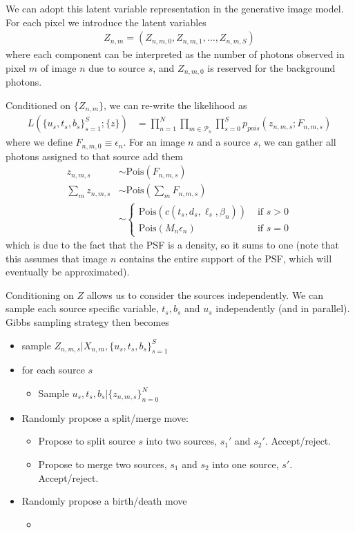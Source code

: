 \documentclass[11pt]{article}
\begin{document}
We can adopt this latent variable representation in the generative image model.  For each pixel we introduce the latent variables
\begin{align}
 Z_{n,m} = (Z_{n,m,0}, Z_{n,m,1}, \dots, Z_{n,m,S})
\end{align}
where each component can be interpreted as the number of photons observed in pixel $m$ of image $n$ due to source $s$, and $Z_{n,m,0}$ is reserved for the background photons.  

Conditioned on $\{Z_{n,m}\}$, we can re-write the likelihood as 
\begin{align}
  L(\{u_s, t_s, b_s\}_{s=1}^S; \{z\})
     &= \prod_{n=1}^N \prod_{m \in \mathcal{P}_n} \prod_{s=0}^S  p_{pois}(z_{n,m,s} ; F_{n,m, s}) 
\end{align}
where we define $F_{n,m,0} \equiv \epsilon_n$.  For an image $n$ and a source $s$, we can gather all photons assigned to that source add them
\begin{align}
  z_{n,m,s} &\sim \textrm{Pois}(F_{n,m,s}) \\
  \sum_{m} z_{n,m,s} &\sim \textrm{Pois}\left( \sum_{m} F_{n,m,s} \right) \\
    &\sim \begin{cases}
         \textrm{Pois}( c(t_s, d_s, \ell_s, \beta_n) ) & \text{ if } s > 0  \\
         \textrm{Pois}( M_n \epsilon_n ) & \text{ if } s = 0 
       \end{cases}
\end{align}
which is due to the fact that the PSF is a density, so it sums to one (note that this assumes that image $n$ contains the entire support of the PSF, which will eventually be approximated).  

Conditioning on $Z$ allows us to consider the sources independently.  We can sample each source specific variable, $t_s, b_s$ and $u_s$ independently (and in parallel).  Gibbs sampling strategy then becomes
\begin{itemize}
\item sample $Z_{n,m,s} | X_{n,m}, \{u_s, t_s, b_s\}_{s=1}^S$
\item for each source $s$
  \begin{itemize}
  \item Sample $u_s, t_s, b_s | \{z_{n,m,s}\}_{n=0}^N$
  \end{itemize}
\item Randomly propose a split/merge move: 
  \begin{itemize}
  \item Propose to split source $s$ into two sources, $s_1'$ and $s_2'$.  Accept/reject.
  \item Propose to merge two sources, $s_1$ and $s_2$ into one source, $s'$.  Accept/reject. 
  \end{itemize}
  
\item Randomly propose a birth/death move
  \begin{itemize}
  \item  
  \end{itemize}
\end{itemize}
 
\end{document}
